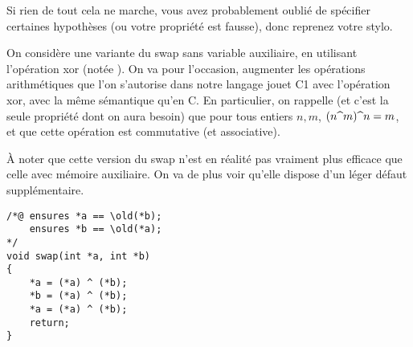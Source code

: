 \documentclass[11pt,answers]{exam}
\begin{document}
Si rien de tout cela ne marche, vous avez probablement oublié de spécifier certaines hypothèses (ou votre propriété est fausse), donc reprenez votre stylo.



\begin{questions}

  
    On considère une variante du swap sans variable auxiliaire, en utilisant l’opération xor (notée \code{^}).
    On va pour l’occasion, augmenter les opérations arithmétiques que l’on s’autorise dans notre langage jouet C1 avec l’opération xor, avec la même sémantique qu’en C.
    En particulier, on rappelle (et c’est la seule propriété dont on aura besoin) que pour tous entiers $n,m$, $(n \code{^} m) \code{^} n = m$, et que cette opération est commutative (et associative).

    À noter que cette version du swap n’est en réalité pas vraiment plus efficace que celle avec mémoire auxiliaire. On va de plus voir qu’elle dispose d’un léger défaut supplémentaire.

        \begin{lstlisting}
/*@ ensures *a == \old(*b);
    ensures *b == \old(*a);
*/
void swap(int *a, int *b)
{
    *a = (*a) ^ (*b);
    *b = (*a) ^ (*b);
    *a = (*a) ^ (*b);
    return;
}
    \end{lstlisting}

\end{questions}
\end{document}
